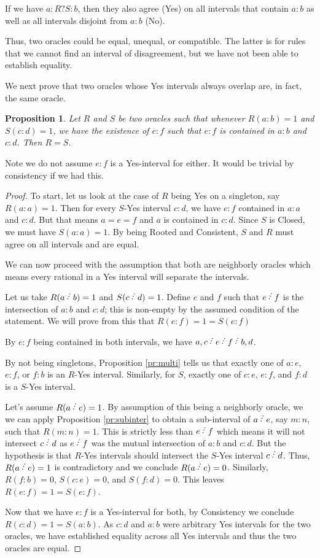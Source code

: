 \documentclass[12pt]{article}
\newtheorem{proposition}{Proposition}[subsection]
\begin{document}
If we have $a:R?S:b$, then they also agree (Yes) on all intervals that contain $a:b$ as well as all intervals disjoint from $a:b$ (No). 

Thus, two oracles could be equal, unequal, or compatible. The latter is for rules that we cannot find an interval of disagreement, but we have not been able to establish equality. 

We next prove that two oracles whose Yes intervals always overlap are, in fact, the same oracle.

\begin{proposition}\label{pr:overlap}
Let $R$ and $S$ be two oracles such that whenever $R(a:b)=1$ and $S(c:d)=1$, we have the existence of $e:f$ such that $e:f$ is contained in $a:b$ and $c:d$.  Then $R =S$.
\end{proposition}

Note we do not assume $e:f$ is a Yes-interval for either. It would be trivial by consistency if we had this. 

\begin{proof}
To start, let us look at the case of $R$ being Yes on a singleton, say $R(a:a) = 1$. Then for every $S$-Yes interval $c:d$, we have $e:f$ contained in $a:a$ and $c:d$. But that means $a=e=f$ and $a$ is contained in $c:d$. Since $S$ is Closed, we must have $S(a:a)=1$. By being Rooted and Consistent, $S$ and $R$ must agree on all intervals and are equal. 

We can now proceed with the assumption that both are neighborly oracles which means every rational in a Yes interval will separate the intervals. 

Let us take $R(a \lte b) = 1$ and $S(c \lte d) = 1$. Define $e$ and $f$ such that $e \lte f$ is the intersection of $a:b$ and $c:d$; this is non-empty by the assumed condition of the statement. We will prove from this that $R(e:f)=1 = S(e:f)$

By $e:f$ being contained in both intervals, we have $a,c \lte e \lte f \lte b,d$.

By not being singletons, Proposition \ref{pr:multi} tells us that exactly one of $a:e$, $e:f$, or $f:b$ is an $R$-Yes interval. Similarly, for $S$, exactly one of $c:e$, $e:f$, and $f:d$ is a $S$-Yes interval. 

Let's assume $R(a \lte e) = 1$. By assumption of this being a neighborly oracle, we we can apply Proposition \ref{pr:subinter} to obtain a sub-interval of $a \lte e$, say $m:n$, such that $R(m:n) = 1$. This is strictly less than $e \lte f$ which means it will not intersect $c \lte d$ as $e \lte f$ was the mutual intersection of $a:b$ and $c:d$. But the hypothesis is that $R$-Yes intervals should intersect the $S$-Yes interval $c \lte d$. Thus, $R(a \lte e) = 1$ is contradictory and we conclude $R(a \lte e) = 0$. Similarly, $R(f:b) = 0$, $S(c:e) = 0$, and $S(f:d) = 0$. This leaves $R(e:f) = 1 = S(e:f)$.

 Now that we have $e:f$ is a Yes-interval for both, by Consistency we conclude $R(c:d) = 1 = S(a:b)$. As $c:d$ and $a:b$ were arbitrary Yes intervals for the two oracles, we have established equality across all Yes intervals and thus the two oracles are equal. 

\end{proof}
\end{document}
